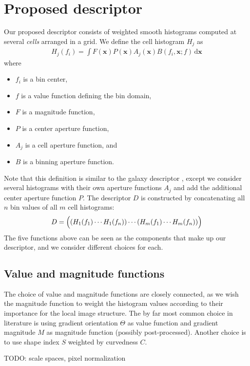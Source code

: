 \documentclass[thesis.tex]{subfiles}
\def\x{\mathbf{x}}
\begin{document}
\chapter{Proposed descriptor}
%
Our proposed descriptor consists of weighted smooth histograms computed at several \textit{cells} arranged in a grid. We define the cell histogram $H_j$ as
%
\begin{align}
H_j(f_i) = \int F(\x) P (\x) A_j (\x) B(f_i, \x; f) \,\text{d} \x
\end{align}
%
where
%
\begin{itemize}
\item[] $f_i$ is a bin center,
\item[] $f$ is a value function defining the bin domain,
\item[] $F$ is a magnitude function,
\item[] $P$ is a center aperture function,
\item[] $A_j$ is a cell aperture function, and
\item[] $B$ is a binning aperture function.
\end{itemize}
%
Note that this definition is similar to the galaxy descriptor \cite{pedersen2013shape}, except we consider several histograms with their own aperture functions $A_j$ and add the additional center aperture function $P$. The descriptor $D$ is constructed by concatenating all $n$ bin values of all $m$ cell histograms:
%
\begin{align}
D = \Bigl( \left(H_1(f_1) \cdots H_1(f_n)\right) \cdots (H_m(f_1) \cdots H_m(f_n)) \Bigr)
\end{align}
%
The five functions above can be seen as the components that make up our descriptor, and we consider different choices for each.
%
\section{Value and magnitude functions}
%
The choice of value and magnitude functions are closely connected, as we wish the magnitude function to weight the histogram values according to their importance for the local image structure. The by far most common choice in literature \cite{lowe2004distinctive,ke2004pca,mikolajczyk2005performance,tola2008fast} is using gradient orientation $\Theta$ as value function and gradient magnitude $M$ as magnitude function (possibly post-processed). Another choice \cite{pedersen2013shape} is to use shape index $S$ weighted by curvedness $C$.

TODO: scale spaces, pixel normalization
%
\end{document}
